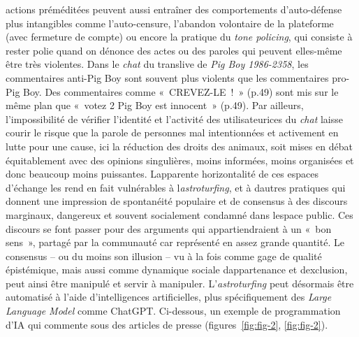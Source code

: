 \documentclass[
]{article}
\begin{document}
actions préméditées peuvent aussi entraîner des comportements d'auto-défense plus intangibles comme l'auto-censure, l'abandon volontaire de la plateforme (avec fermeture de compte) ou encore la pratique du \emph{tone policing}, qui consiste à rester polie quand on dénonce des actes ou des paroles qui peuvent elles-même être très violentes. Dans le \emph{chat} du translive de \emph{Pig Boy 1986-2358}, les commentaires anti-Pig Boy sont souvent plus violents que les commentaires pro-Pig Boy. Des commentaires comme «~CREVEZ-LE~!~» (p.49) sont mis sur le même plan que «~votez 2 Pig Boy est innocent~» (p.49). Par ailleurs, l'impossibilité de vérifier l'identité et l'activité des utilisateurices du \emph{chat} laisse courir le risque que la parole de personnes mal intentionnées et activement en lutte pour une cause, ici la réduction des droits des animaux, soit mises en débat équitablement avec des opinions singulières, moins informées, moins organisées et donc beaucoup moins puissantes. L\textquotesingle apparente horizontalité de ces espaces d'échange les rend en fait vulnérables à l\textquotesingle{}\emph{astroturfing}, et à d\textquotesingle autres pratiques qui donnent une impression de spontanéité populaire et de consensus à des discours marginaux, dangereux et souvent socialement condamné dans l\textquotesingle espace public. Ces discours se font passer pour des arguments qui appartiendraient à un «~bon sens~», partagé par la communauté car représenté en assez grande quantité. Le consensus -- ou du moins son illusion -- vu à la fois comme gage de qualité épistémique, mais aussi comme dynamique sociale d\textquotesingle appartenance et d\textquotesingle exclusion, peut ainsi être manipulé et servir à manipuler. L'\emph{astroturfing} peut désormais être automatisé à l'aide d'intelligences artificielles, plus spécifiquement des \emph{Large Language Model} comme ChatGPT. Ci-dessous, un exemple de programmation d'IA qui commente sous des articles de presse (figures~\ref{fig:fig-2}, \ref{fig:fig-2}).
\end{document}
